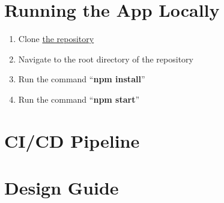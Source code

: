 \section{Running the App Locally}
\begin{enumerate}
    \item Clone \href{https://github.com/ImACoderImACoderImACoder/onyx}{the repository}
    \item Navigate to the root directory of the repository
    \item Run the command ``\textbf{npm install}''
    \item Run the command ``\textbf{npm start}''
\end{enumerate}
\section{CI/CD Pipeline}
\section{Design Guide}